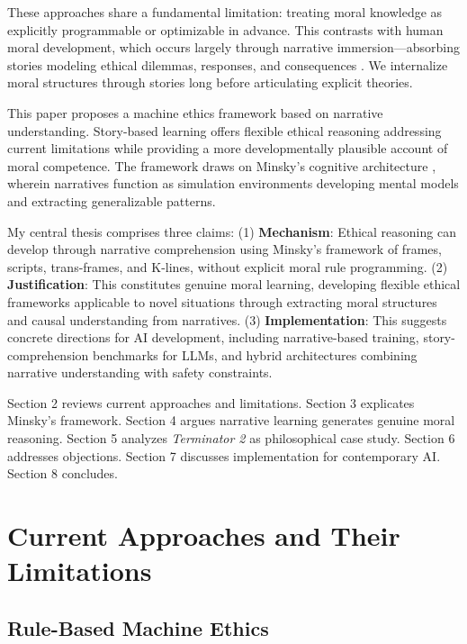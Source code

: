 \documentclass[12pt]{article}
\begin{document}
These approaches share a fundamental limitation: treating moral knowledge as explicitly programmable or optimizable in advance. This contrasts with human moral development, which occurs largely through narrative immersion---absorbing stories modeling ethical dilemmas, responses, and consequences \citep{nussbaum1990love, johnson1993moral}. We internalize moral structures through stories long before articulating explicit theories.

This paper proposes a machine ethics framework based on narrative understanding. Story-based learning offers flexible ethical reasoning addressing current limitations while providing a more developmentally plausible account of moral competence. The framework draws on Minsky's cognitive architecture \citep{minsky1986society, minsky2006emotion}, wherein narratives function as simulation environments developing mental models and extracting generalizable patterns.

My central thesis comprises three claims: (1) \textbf{Mechanism}: Ethical reasoning can develop through narrative comprehension using Minsky's framework of frames, scripts, trans-frames, and K-lines, without explicit moral rule programming. (2) \textbf{Justification}: This constitutes genuine moral learning, developing flexible ethical frameworks applicable to novel situations through extracting moral structures and causal understanding from narratives. (3) \textbf{Implementation}: This suggests concrete directions for AI development, including narrative-based training, story-comprehension benchmarks for LLMs, and hybrid architectures combining narrative understanding with safety constraints.

Section 2 reviews current approaches and limitations. Section 3 explicates Minsky's framework. Section 4 argues narrative learning generates genuine moral reasoning. Section 5 analyzes \textit{Terminator 2} as philosophical case study. Section 6 addresses objections. Section 7 discusses implementation for contemporary AI. Section 8 concludes.

\section{Current Approaches and Their Limitations}

\subsection{Rule-Based Machine Ethics}
\end{document}
